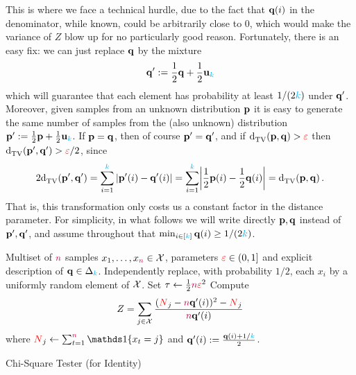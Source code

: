 This is where we face a technical hurdle, due to the fact that $\mathbf{q}(i)$ in the denominator, while known, could be arbitrarily close to $0$, which would make the variance of $Z$ blow up for no particularly good reason. Fortunately, there is an easy fix: we can just replace $\mathbf{q}$ by the mixture 
\begin{equation}
	\label{eq:trick:mixture}
  \mathbf{q}' := \frac{1}{2}\mathbf{q}+\frac{1}{2}\mathbf{u}_{\textcolor{cyan}{k}}
\end{equation}
which will guarantee that each element has probability at least $1/(2{\textcolor{cyan}{k}})$ under $\mathbf{q}'$. Moreover, given samples from an unknown distribution $\mathbf{p}$ it is easy to generate the same number of samples from the (also unknown) distribution $\mathbf{p}'  := \frac{1}{2}\mathbf{p}+\frac{1}{2}\mathbf{u}_{\textcolor{cyan}{k}}$. If $\mathbf{p}=\mathbf{q}$, then of course $\mathbf{p}'=\mathbf{q}'$, and if $\totalvardist{\p}{\q} > \dst$ then $\totalvardist{\p'}{\q'} > \dst/2$, since
\[
  2\totalvardist{\p'}{\q'} = \sum_{i=1}^\ab |\p'(i)-\q'(i)|
  = \sum_{i=1}^\ab \abs{ \frac{1}{2}\p(i)-\frac{1}{2}\q(i) }
  = \totalvardist{\p}{\q}\,.
\]
That is, this transformation only costs us a constant factor in the distance parameter. For simplicity, in what follows  we will write directly $\mathbf{p},\mathbf{q}$ instead of $\mathbf{p}',\mathbf{q}'$, and assume throughout that $\min_{i\in[{\textcolor{cyan}{k}}]} \mathbf{q}(i) \geq 1/(2{\textcolor{cyan}{k}})$.

\begin{algorithm}[ht!]
  \begin{algorithmic}[1]
    \Require Multiset of ${\textcolor{purple}{n}}$ samples $x_1,\dots,x_{\textcolor{purple}{n}} \in \mathcal{X}$, parameters $\textcolor{red}{\varepsilon}\in(0,1]$ and explicit description of $\mathbf{q}\in\Delta_{{\textcolor{cyan}{k}}}$.
    \State Independently replace, with probability $1/2$, each $x_i$ by a uniformly random element of $\mathcal{X}$. 
    \State Set $\tau \gets \frac{1}{2}{\textcolor{purple}{n}}\textcolor{red}{\varepsilon}^2$ 
    \State Compute
    \[
        Z = \sum_{j\in\mathcal{X}} \frac{(\textcolor{red}{N}_j-{\textcolor{purple}{n}}\mathbf{q}'(i))^2-\textcolor{red}{N}_j}{{\textcolor{purple}{n}}\mathbf{q}'(i)}
    \] where $\occur_j \gets \sum_{t=1}^\ns\indic{x_t=j}$ and $\mathbf{q}'(i) := \frac{\mathbf{q}(i)+1/{\textcolor{cyan}{k}}}{2}$.
     \Return \reject {}
    \Else\ 
      \Return \accept {}
    \EndIf
  \end{algorithmic}
  \caption{\label{algo:chisquare:identity}\sc Chi-Square Tester (for Identity)}
\end{algorithm}

